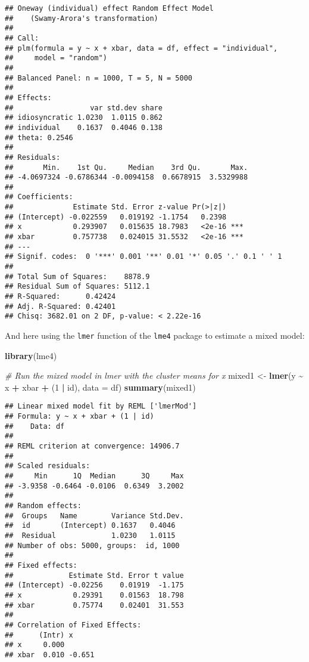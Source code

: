 \documentclass[]{interact}
\theoremstyle{plain}%
\theoremstyle{definition}
\theoremstyle{remark}
\newenvironment{Shaded}{\begin{snugshade}}{\end{snugshade}}
\newcommand{\CommentTok}[1]{\textcolor[rgb]{0.56,0.35,0.01}{\textit{#1}}}
\newcommand{\DataTypeTok}[1]{\textcolor[rgb]{0.13,0.29,0.53}{#1}}
\newcommand{\DecValTok}[1]{\textcolor[rgb]{0.00,0.00,0.81}{#1}}
\newcommand{\KeywordTok}[1]{\textcolor[rgb]{0.13,0.29,0.53}{\textbf{#1}}}
\newcommand{\NormalTok}[1]{#1}
\newcommand{\OperatorTok}[1]{\textcolor[rgb]{0.81,0.36,0.00}{\textbf{#1}}}
\newcommand{\StringTok}[1]{\textcolor[rgb]{0.31,0.60,0.02}{#1}}
\begin{document}
\begin{verbatim}
## Oneway (individual) effect Random Effect Model 
##    (Swamy-Arora's transformation)
## 
## Call:
## plm(formula = y ~ x + xbar, data = df, effect = "individual", 
##     model = "random")
## 
## Balanced Panel: n = 1000, T = 5, N = 5000
## 
## Effects:
##                  var std.dev share
## idiosyncratic 1.0230  1.0115 0.862
## individual    0.1637  0.4046 0.138
## theta: 0.2546
## 
## Residuals:
##       Min.    1st Qu.     Median    3rd Qu.       Max. 
## -4.0697324 -0.6786344 -0.0094158  0.6678915  3.5329988 
## 
## Coefficients:
##              Estimate Std. Error z-value Pr(>|z|)    
## (Intercept) -0.022559   0.019192 -1.1754   0.2398    
## x            0.293907   0.015635 18.7983   <2e-16 ***
## xbar         0.757738   0.024015 31.5532   <2e-16 ***
## ---
## Signif. codes:  0 '***' 0.001 '**' 0.01 '*' 0.05 '.' 0.1 ' ' 1
## 
## Total Sum of Squares:    8878.9
## Residual Sum of Squares: 5112.1
## R-Squared:      0.42424
## Adj. R-Squared: 0.42401
## Chisq: 3682.01 on 2 DF, p-value: < 2.22e-16
\end{verbatim}

\doublespacing

And here using the \texttt{lmer} function of the \texttt{lme4} package
\citep{Bates2015} to estimate a mixed model:

\singlespacing

\begin{Shaded}
\begin{Highlighting}[]
\KeywordTok{library}\NormalTok{(lme4)}

\CommentTok{\# Run the mixed model in lmer with the cluster means for x }
\NormalTok{mixed1 \textless{}{-}}\StringTok{ }\KeywordTok{lmer}\NormalTok{(y }\OperatorTok{\textasciitilde{}}\StringTok{ }\NormalTok{x }\OperatorTok{+}\StringTok{ }\NormalTok{xbar }\OperatorTok{+}\StringTok{ }\NormalTok{(}\DecValTok{1} \OperatorTok{|}\StringTok{ }\NormalTok{id), }\DataTypeTok{data =}\NormalTok{ df)}
\KeywordTok{summary}\NormalTok{(mixed1)}
\end{Highlighting}
\end{Shaded}

\begin{verbatim}
## Linear mixed model fit by REML ['lmerMod']
## Formula: y ~ x + xbar + (1 | id)
##    Data: df
## 
## REML criterion at convergence: 14906.7
## 
## Scaled residuals: 
##     Min      1Q  Median      3Q     Max 
## -3.9358 -0.6464 -0.0106  0.6349  3.2002 
## 
## Random effects:
##  Groups   Name        Variance Std.Dev.
##  id       (Intercept) 0.1637   0.4046  
##  Residual             1.0230   1.0115  
## Number of obs: 5000, groups:  id, 1000
## 
## Fixed effects:
##             Estimate Std. Error t value
## (Intercept) -0.02256    0.01919  -1.175
## x            0.29391    0.01563  18.798
## xbar         0.75774    0.02401  31.553
## 
## Correlation of Fixed Effects:
##      (Intr) x     
## x     0.000       
## xbar  0.010 -0.651
\end{verbatim}
\end{document}
